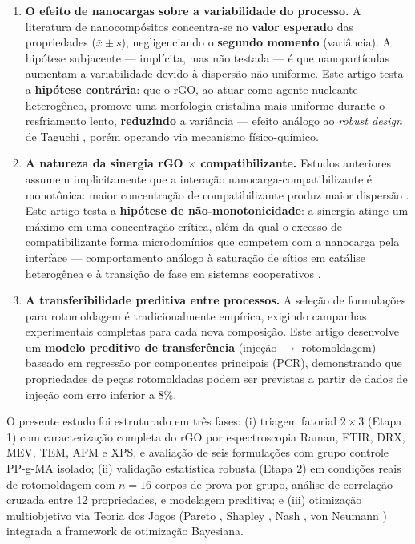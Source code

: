 \documentclass[12pt,a4paper,twoside]{article}
\begin{document}
\begin{enumerate}[label=\textbf{(\Roman*)}, leftmargin=*]
    \item \textbf{O efeito de nanocargas sobre a variabilidade do processo.} A literatura de nanocompósitos concentra-se no \textbf{valor esperado} das propriedades ($\bar{x} \pm s$), negligenciando o \textbf{segundo momento} (variância). A hipótese subjacente — implícita, mas não testada — é que nanopartículas aumentam a variabilidade devido à dispersão não-uniforme. Este artigo testa a \textbf{hipótese contrária}: que o rGO, ao atuar como agente nucleante heterogêneo, promove uma morfologia cristalina mais uniforme durante o resfriamento lento, \textbf{reduzindo} a variância — efeito análogo ao \textit{robust design} de Taguchi \cite{Taguchi1986}, porém operando via mecanismo físico-químico.
    
    \item \textbf{A natureza da sinergia rGO $\times$ compatibilizante.} Estudos anteriores assumem implicitamente que a interação nanocarga-compatibilizante é monotônica: maior concentração de compatibilizante produz maior dispersão \cite{Natarajan2020, Sanchez2018}. Este artigo testa a \textbf{hipótese de não-monotonicidade}: a sinergia atinge um máximo em uma concentração crítica, além da qual o excesso de compatibilizante forma microdomínios que competem com a nanocarga pela interface — comportamento análogo à saturação de sítios em catálise heterogênea e à transição de fase em sistemas cooperativos \cite{Ising1925}.
    
    \item \textbf{A transferibilidade preditiva entre processos.} A seleção de formulações para rotomoldagem é tradicionalmente empírica, exigindo campanhas experimentais completas para cada nova composição. Este artigo desenvolve um \textbf{modelo preditivo de transferência} (injeção $\rightarrow$ rotomoldagem) baseado em regressão por componentes principais (PCR), demonstrando que propriedades de peças rotomoldadas podem ser previstas a partir de dados de injeção com erro inferior a 8\%.
\end{enumerate}

O presente estudo foi estruturado em três fases: (i) triagem fatorial $2\times3$ (Etapa 1) com caracterização completa do rGO por espectroscopia Raman, FTIR, DRX, MEV, TEM, AFM e XPS, e avaliação de seis formulações com grupo controle PP-g-MA isolado; (ii) validação estatística robusta (Etapa 2) em condições reais de rotomoldagem com $n=16$ corpos de prova por grupo, análise de correlação cruzada entre 12 propriedades, e modelagem preditiva; e (iii) otimização multiobjetivo via Teoria dos Jogos (Pareto \cite{Pareto1906}, Shapley \cite{Shapley1953}, Nash \cite{Nash1950}, von Neumann \cite{VonNeumann1928}) integrada a framework de otimização Bayesiana.
\end{document}
